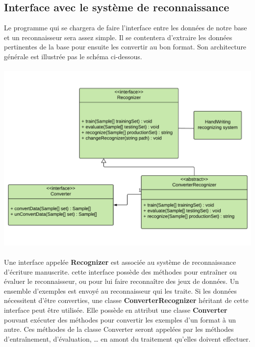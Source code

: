 \subsection{Interface avec le système de reconnaissance}

Le programme qui se chargera de faire l’interface entre les données de notre base et un reconnaisseur sera assez simple. Il se contentera d’extraire les données pertinentes de la base pour ensuite les convertir au bon format. Son architecture générale est illustrée pas le schéma ci-dessous.

\paragraph{}

\begin{mdframed}[frametitle={Figure 9 : Diagramme de classes de l'interface avec le système de reconaissance d'écriture manuscrite}, innerbottommargin=10]
\begin{center}
\includegraphics[scale=0.6]{interface-reconnaisseur.pdf}
\end{center}
\end{mdframed}

\paragraph{}

Une interface appelée \textbf{Recognizer} est associée au système de reconnaissance d’écriture manuscrite. cette interface possède des méthodes pour entraîner ou  évaluer le reconnaisseur, ou pour lui faire reconnaître des jeux de données. Un ensemble d’exemples est envoyé au reconnaisseur qui les traite.
Si les données nécessitent d’être converties, une classe \textbf{ConverterRecognizer} héritant de cette interface peut être utilisée. Elle possède en attribut une classe \textbf{Converter} pouvant exécuter des méthodes pour convertir les exemples d’un format à un autre. Ces méthodes de la classe Converter seront appelées par les méthodes d’entraînement, d’évaluation, … en amont du traitement qu’elles doivent effectuer.

